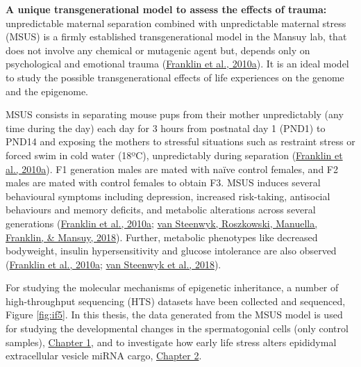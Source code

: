 \documentclass[12pt,twoside]{reedthesis}
\begin{document}
\textbf{A unique transgenerational model to assess the effects of trauma:}
unpredictable maternal separation combined with unpredictable maternal
stress (MSUS) is a firmly established transgenerational model in the
Mansuy lab, that does not involve any chemical or mutagenic agent but,
depends only on psychological and emotional trauma (\protect\hyperlink{ref-franklin2010}{Franklin et al., 2010a}). It is an ideal model to study the possible
transgenerational effects of life experiences on the genome and the
epigenome.

MSUS consists in separating mouse pups from their mother unpredictably
(any time during the day) each day for 3 hours from postnatal day 1
(PND1) to PND14 and exposing the mothers to stressful situations such as
restraint stress or forced swim in cold water (18ºC), unpredictably
during separation (\protect\hyperlink{ref-franklin2010}{Franklin et al., 2010a}). F1 generation males are mated with
naïve control females, and F2 males are mated with control females to
obtain F3. MSUS induces several behavioural symptoms including
depression, increased risk-taking, antisocial behaviours and memory
deficits, and metabolic alterations across several generations
(\protect\hyperlink{ref-franklin2010}{Franklin et al., 2010a}; \protect\hyperlink{ref-vansteenwyk2018}{van Steenwyk, Roszkowski, Manuella, Franklin, \& Mansuy, 2018}). Further, metabolic phenotypes like
decreased bodyweight, insulin hypersensitivity and glucose intolerance
are also observed (\protect\hyperlink{ref-franklin2010}{Franklin et al., 2010a}; \protect\hyperlink{ref-vansteenwyk2018}{van Steenwyk et al., 2018}).

For studying the molecular mechanisms of epigenetic inheritance, a
number of high-throughput sequencing (HTS) datasets have been collected
and sequenced, Figure \ref{fig:if5}. In this thesis, the data generated
from the MSUS model is used for studying the developmental changes in
the spermatogonial cells (only control samples), \protect\hyperlink{chapter1}{Chapter 1},
and to investigate how early life stress alters epididymal extracellular
vesicle miRNA cargo, \protect\hyperlink{chapter2}{Chapter 2}.
\end{document}
